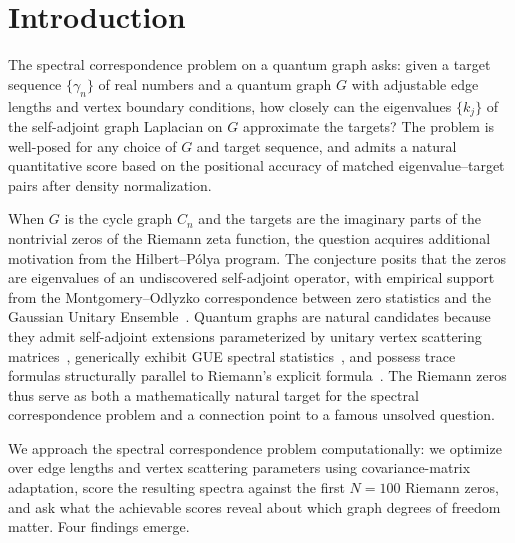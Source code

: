 \documentclass[cntp]{ipart}
\theoremstyle{plain}
\theoremstyle{remark}
\begin{document}
\section{Introduction}
\label{sec:intro}

The spectral correspondence problem on a quantum graph asks: given a target sequence $\{\gamma_n\}$ of real numbers and a quantum graph $G$ with adjustable edge lengths and vertex boundary conditions, how closely can the eigenvalues $\{k_j\}$ of the self-adjoint graph Laplacian on $G$ approximate the targets? The problem is well-posed for any choice of $G$ and target sequence, and admits a natural quantitative score based on the positional accuracy of matched eigenvalue--target pairs after density normalization.

When $G$ is the cycle graph $C_n$ and the targets are the imaginary parts of the nontrivial zeros of the Riemann zeta function, the question acquires additional motivation from the Hilbert--P\'olya program. The conjecture posits that the zeros are eigenvalues of an undiscovered self-adjoint operator, with empirical support from the Montgomery--Odlyzko correspondence between zero statistics and the Gaussian Unitary Ensemble~\cite{r1,r2}. Quantum graphs are natural candidates because they admit self-adjoint extensions parameterized by unitary vertex scattering matrices~\cite{r3}, generically exhibit GUE spectral statistics~\cite{r4}, and possess trace formulas structurally parallel to Riemann's explicit formula~\cite{r5}. The Riemann zeros thus serve as both a mathematically natural target for the spectral correspondence problem and a connection point to a famous unsolved question.

We approach the spectral correspondence problem computationally: we optimize over edge lengths and vertex scattering parameters using covariance-matrix adaptation, score the resulting spectra against the first $N = 100$ Riemann zeros, and ask what the achievable scores reveal about which graph degrees of freedom matter. Four findings emerge.
\end{document}
